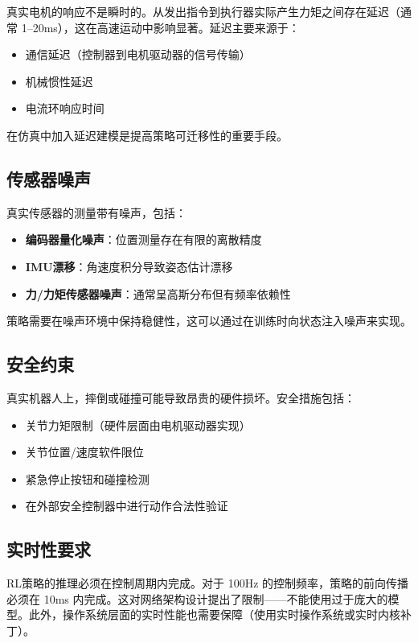 真实电机的响应不是瞬时的。从发出指令到执行器实际产生力矩之间存在延迟（通常 1--20ms），这在高速运动中影响显著。延迟主要来源于：
\begin{itemize}
    \item 通信延迟（控制器到电机驱动器的信号传输）
    \item 机械惯性延迟
    \item 电流环响应时间
\end{itemize}

在仿真中加入延迟建模是提高策略可迁移性的重要手段。

\subsection{传感器噪声}

真实传感器的测量带有噪声，包括：
\begin{itemize}
    \item \textbf{编码器量化噪声}：位置测量存在有限的离散精度
    \item \textbf{IMU漂移}：角速度积分导致姿态估计漂移
    \item \textbf{力/力矩传感器噪声}：通常呈高斯分布但有频率依赖性
\end{itemize}

策略需要在噪声环境中保持稳健性，这可以通过在训练时向状态注入噪声来实现。

\subsection{安全约束}

真实机器人上，摔倒或碰撞可能导致昂贵的硬件损坏。安全措施包括：
\begin{itemize}
    \item 关节力矩限制（硬件层面由电机驱动器实现）
    \item 关节位置/速度软件限位
    \item 紧急停止按钮和碰撞检测
    \item 在外部安全控制器中进行动作合法性验证
\end{itemize}

\subsection{实时性要求}

RL策略的推理必须在控制周期内完成。对于 100Hz 的控制频率，策略的前向传播必须在 10ms 内完成。这对网络架构设计提出了限制——不能使用过于庞大的模型。此外，操作系统层面的实时性能也需要保障（使用实时操作系统或实时内核补丁）。

